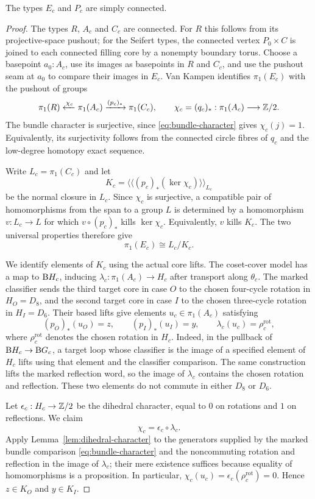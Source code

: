 \begin{proposition}\label{prop:seifert-simple}
The types $E_c$ and $P_c$ are simply connected.
\end{proposition}
\begin{proof}
The types $R$, $A_c$ and $C_c$ are connected. For $R$ this follows from its projective-space pushout; for the Seifert types, the connected vertex $P_0\times C$ is joined to each connected filling core by a nonempty boundary torus. Choose a basepoint $a_0:A_c$, use its images as basepoints in $R$ and $C_c$, and use the pushout seam at $a_0$ to compare their images in $E_c$. Van Kampen \cite[\S8.7]{hott} identifies $\pi_1(E_c)$ with the pushout of groups
\[
\pi_1(R)\xleftarrow{\chi_c}\pi_1(A_c)
 \xrightarrow{(p_c)_*}\pi_1(C_c),
\qquad \chi_c=(q_c)_*:\pi_1(A_c)\longrightarrow\mathbb Z/2.
\]
The bundle character is surjective, since \eqref{eq:bundle-character} gives $\chi_c(j)=1$. Equivalently, its surjectivity follows from the connected circle fibres of $q_c$ and the low-degree homotopy exact sequence.

Write $L_c=\pi_1(C_c)$ and let
\[
K_c=\bigl\langle\!\bigl\langle
 (p_c)_*(\ker\chi_c)
\bigr\rangle\!\bigr\rangle_{L_c}
\]
be the normal closure in $L_c$. Since $\chi_c$ is surjective, a compatible pair of homomorphisms from the span to a group $L$ is determined by a homomorphism $v:L_c\to L$ for which $v\circ(p_c)_*$ kills $\ker\chi_c$. Equivalently, $v$ kills $K_c$. The two universal properties therefore give
\[
\pi_1(E_c)\cong L_c/K_c.
\]

We identify elements of $K_c$ using the actual core lifts. The coset-cover model has a map to $\mathrm B H_c$, inducing
$\lambda_c:\pi_1(A_c)\to H_c$ after transport along $\theta_c$. The marked classifier sends the third target core in case $O$ to the chosen four-cycle rotation in $H_O=D_8$, and the second target core in case $I$ to the chosen three-cycle rotation in $H_I=D_6$. Their based lifts give elements $u_c\in\pi_1(A_c)$ satisfying
\[
(p_O)_*(u_O)=z,\qquad (p_I)_*(u_I)=y,
\qquad \lambda_c(u_c)=\rho_c^{\mathrm{rot}},
\]
where $\rho_c^{\mathrm{rot}}$ denotes the chosen rotation in $H_c$. Indeed, in the pullback of $\mathrm B H_c\to\mathrm B G_c$, a target loop whose classifier is the image of a specified element of $H_c$ lifts using that element and the classifier comparison. The same construction lifts the marked reflection word, so the image of $\lambda_c$ contains the chosen rotation and reflection. These two elements do not commute in either $D_8$ or $D_6$.

Let $\epsilon_c:H_c\to\mathbb Z/2$ be the dihedral character, equal to $0$ on rotations and $1$ on reflections. We claim
\[
\chi_c=\epsilon_c\circ\lambda_c.
\]
Apply Lemma~\ref{lem:dihedral-character} to the generators supplied by the marked bundle comparison \eqref{eq:bundle-character} and the noncommuting rotation and reflection in the image of $\lambda_c$; their mere existence suffices because equality of homomorphisms is a proposition.
In particular,
$\chi_c(u_c)=\epsilon_c(\rho_c^{\mathrm{rot}})=0$.
Hence $z\in K_O$ and $y\in K_I$.


\end{proof}
